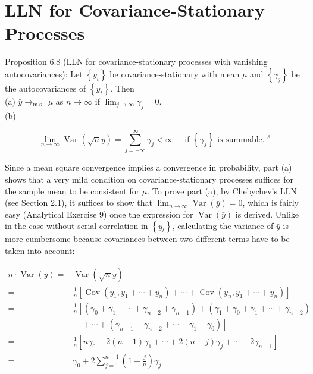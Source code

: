 \documentclass[10pt]{article}
\begin{document}
\section*{LLN for Covariance-Stationary Processes}
Proposition 6.8 (LLN for covariance-stationary processes with vanishing autocovariances): Let $\left\{y_{t}\right\}$ be covariance-stationary with mean $\mu$ and $\left\{\gamma_{j}\right\}$ be the autocovariances of $\left\{y_{t}\right\}$. Then\\
(a) $\bar{y} \rightarrow_{\text {m.s. }} \mu$ as $n \rightarrow \infty$ if $\lim _{j \rightarrow \infty} \gamma_{j}=0$.\\
(b)


\begin{equation*}
\lim _{n \rightarrow \infty} \operatorname{Var}(\sqrt{n} \bar{y})=\sum_{j=-\infty}^{\infty} \gamma_{j}<\infty \quad \text { if }\left\{\gamma_{j}\right\} \text { is summable. }{ }^{8} \tag{6.5.1}
\end{equation*}


Since a mean square convergence implies a convergence in probability, part (a) shows that a very mild condition on covariance-stationary processes suffices for the sample mean to be consistent for $\mu$. To prove part (a), by Chebychev's LLN (see Section 2.1), it suffices to show that $\lim _{n \rightarrow \infty} \operatorname{Var}(\bar{y})=0$, which is fairly easy (Analytical Exercise 9) once the expression for $\operatorname{Var}(\bar{y})$ is derived. Unlike in the case without serial correlation in $\left\{y_{t}\right\}$, calculating the variance of $\bar{y}$ is more cumbersome because covariances between two different terms have to be taken into account:


\begin{align*}
n \cdot \operatorname{Var}(\bar{y})= & \operatorname{Var}(\sqrt{n} \bar{y}) \\
= & \frac{1}{n}\left[\operatorname{Cov}\left(y_{1}, y_{1}+\cdots+y_{n}\right)+\cdots+\operatorname{Cov}\left(y_{n}, y_{1}+\cdots+y_{n}\right)\right] \\
= & \frac{1}{n}\left[\left(\gamma_{0}+\gamma_{1}+\cdots+\gamma_{n-2}+\gamma_{n-1}\right)+\left(\gamma_{1}+\gamma_{0}+\gamma_{1}+\cdots+\gamma_{n-2}\right)\right. \\
& \left.\quad+\cdots+\left(\gamma_{n-1}+\gamma_{n-2}+\cdots+\gamma_{1}+\gamma_{0}\right)\right] \\
= & \frac{1}{n}\left[n \gamma_{0}+2(n-1) \gamma_{1}+\cdots+2(n-j) \gamma_{j}+\cdots+2 \gamma_{n-1}\right] \\
= & \gamma_{0}+2 \sum_{j=1}^{n-1}\left(1-\frac{j}{n}\right) \gamma_{j} \tag{6.5.2}
\end{align*}
\end{document}

